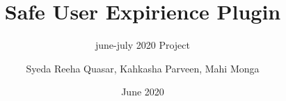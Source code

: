 \documentclass[14pt]{beamer}
\title[SUE]{Safe User Expirience Plugin}
\subtitle{june-july 2020 Project}
\author[Team 36]{Syeda Reeha Quasar, Kahkasha Parveen, Mahi Monga}
\date{June 2020}
\begin{document}
\begin{frame}
    \titlepage
\end{frame}
\end{document}
